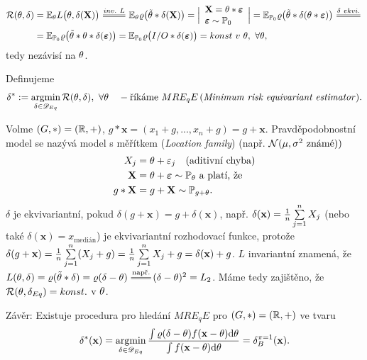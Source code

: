 \begin{dusl}
	\[
	\begin{split}
	\RF(\t,\delta)&=\E_\t L\big(\t,\delta(\textbf{X})\big)\equal{inv.~L}\E_\t\rho\big(\tilde{\t}\ast\delta(\textbf{X})\big)=\Big|\begin{array}{l}
	\textbf{X}=\t\ast\boldsymbol{\epsilon}\\\boldsymbol{\epsilon}\sim\PP_0	
	\end{array}
	\Big|=\E_{\PP_0}\rho\big(\tilde{\t}\ast\delta(\t\ast\boldsymbol{\epsilon})\big)\equal{\delta~ekvi.}\\&=\E_{\PP_0}\rho\big(\tilde{\t}\ast\t\ast\delta(\boldsymbol{\epsilon})\big)=\E_{\PP_0}\rho\big(I/O\ast\delta(\boldsymbol{\epsilon})\big)=konst~v~\t,~\forall\t,
	\end{split}
	\]
tedy nezávisí na $\theta$.
\end{dusl}
\begin{define}
	Definujeme $$ \delta^\ast:=\mathop{\mathrm{argmin}}_{\delta\in\mathscr{D}_{Eq}}\mathcal{R}(\theta,\delta),~\forall\theta\quad-\text{říkáme }MRE_qE\,(\text{\textit{Minimum risk equivariant estimator}}).$$
\end{define}
\begin{example}
	Volme $(G,\ast)=(\mathbb{R},+)$, $g\ast\textbf{x}=(x_1+g,...,x_n+g)=g+\textbf{x}.$ Pravděpodobnostní model se nazývá model s měřítkem (\textit{Location family}) (např. $\mathcal{N}(\mu,\sigma^2 \text{ známé}))$
	\[
\begin{split}
X_j&=\theta+\varepsilon_j\quad(\text{aditivní chyba})\\
\textbf{X}&=\theta+\boldsymbol{\varepsilon}\sim\mathbb{P}_\theta\text{ a platí, že }\\
g\ast \textbf{X}&=g+\textbf{X}\sim \mathbb{P}_{g+\theta}.
\end{split}
\]
	$\delta$ je ekvivariantní, pokud $\delta(g+\textbf{x})=g+\delta(\textbf{x})$, např. $\delta(\textbf{x})=\frac{1}{n}\sum\limits_{j=1}^{n} X_j$ (nebo také $\delta(\textbf{x})=x_{\text{medián}}$) je ekvivariantní rozhodovací funkce, protože $\delta(g+\textbf{x})=\frac{1}{n}\sum\limits_{j=1}^{n} (X_j+g)=\frac{1}{n}\sum\limits_{j=1}^{n} X_j + g=\delta(\textbf{x})+g$. $L$ invariantní znamená, že $L(\t,\delta)=\rho(\tilde{\t}\ast\delta)=\rho(\delta-\t)\equal{\text{např.}}(\delta-\t)^2=L_2$. Máme tedy zajištěno, že $\mathcal{R}(\theta,\delta_{Eq})=konst.$ v $\theta$.
\end{example}

Závěr: Existuje procedura pro hledání $MRE_qE$ pro $(G,\ast)=(\mathbb{R},+)$ ve tvaru
$$ \delta^\ast(\textbf{x})=\mathop{\mathrm{argmin}}_{\delta\in\mathscr{D}_{Eq}}\frac{\int\varrho(\delta-\theta)f(\textbf{x}-\theta)\mathrm{d}\theta}{\int f(\textbf{x}-\theta)\mathrm{d}\theta}=\delta_B^{\pi=1}(\textbf{x}).$$


